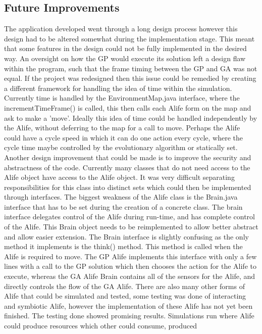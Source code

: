 \documentclass[12pt]{article}
\begin{document}
\subsection{Future Improvements}
The application developed went through a long design process however this design had to be altered somewhat during the implementation stage. This meant that some
features in the design could not be fully implemented in the desired way. An oversight on how the GP would execute its solution left a design flaw within the program,
such that the frame timing between the GP and GA was not equal. If the project was redesigned then this issue could be remedied by creating a different framework for
handling the idea of time within the simulation. Currently time is handled by the EnvironmentMap.java interface, where the incrementTimeFrame() is called, this then
calls each Alife form on the map and ask to make a 'move'. Ideally this idea of time could be handled independently by the Alife, without deferring to the map for
a call to move. Perhaps the Alife could have a cycle speed in which it can do one action every cycle, where the cycle time maybe controlled by the evolutionary algorithm
or statically set. 
Another design improvement that could be made is to improve the security and abstractness of the code. Currently many classes that do not need access to the Alife
object have access to the Alife object. It was very difficult separating responsibilities for this class into distinct sets which could then be implemented through
interfaces. The biggest weakness of the Alife class is the Brain.java interface that has to be set during the creation of a concrete class. The brain interface
delegates control of the Alife during run-time, and has complete control of the Alife. This Brain object needs to be reimplemented to allow better abstract and allow
easier extension. The Brain interface is slightly confusing as the only method it implements is the think() method. This method is called when the Alife is required to
move. The GP Alife implements this interface with only a few lines with a call to the GP solution which then chooses the action for the Alife to execute, whereas the
GA Alife Brain contains all of the sensors for the Alife, and directly controls the flow of the GA Alife.
There are also many other forms of Alife that could be simulated and tested, some testing was done of interacting and symbiotic Alife, however the implementation of
these Alife has not yet been finished. The testing done showed promising results. Simulations run where Alife could produce resources which other could consume, produced
\end{document}
